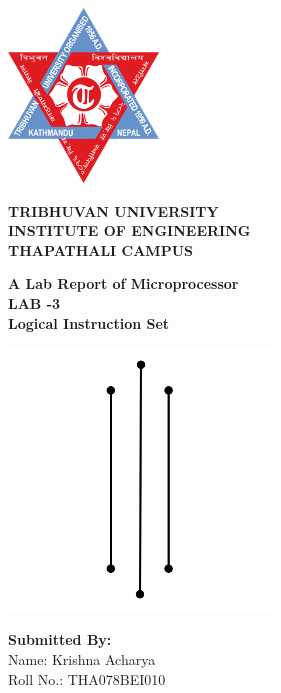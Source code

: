 \documentclass[]{report}
\author{Krishna Acharya}
\begin{document}
\begin{titlepage}
    \noindent
    \begin{center}
        \includegraphics[width=4cm]{img/logo.png}

        {\fontsize{12}{14.4} \bfseries \centering TRIBHUVAN UNIVERSITY \\ INSTITUTE OF ENGINEERING \\ THAPATHALI CAMPUS \\ }

        \vspace{1.5cm}

        {\bfseries A Lab Report of Microprocessor \\ LAB -3 \\ Logical Instruction Set \linebreak[4] \\}

        \vspace{0.75cm}

        \includegraphics[width=7cm]{img/vline.png}

        \vspace{0.75cm}

        {\bfseries Submitted By:} \\

        Name: Krishna Acharya \\
        Roll No.: THA078BEI010 \\


\end{center}
\end{titlepage}
\end{document}
